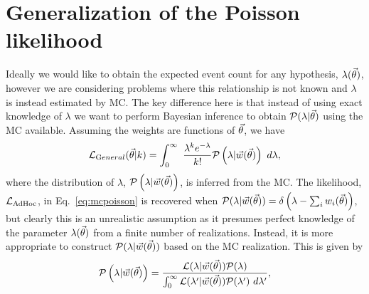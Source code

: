 \section{Generalization of the Poisson likelihood\label{sec:generalization_poisson}}


Ideally we would like to obtain the expected event count for any hypothesis, $\lambda(\vec{\theta})$, however we are considering problems where this relationship is not known and $\lambda$ is instead estimated by MC. The key difference here is that instead of using exact knowledge of $\lambda$ we want to perform Bayesian inference to obtain $\mathcal{P}(\lambda|\vec{\theta})$ using the MC available. Assuming the weights are functions of $\vec{\theta}$, we have 
\begin{equation} \label{eq:generalpoisson}
\mathcal{L}_{\textrm General}(\vec{\theta}|k) = \int_{0}^{\infty}~\frac{\lambda^{k}e^{-\lambda}}{k!}\mathcal{P}\left(\lambda|\vec{w}(\vec{\theta})\right)~d\lambda,
\end{equation}
where the distribution of $\lambda$, $\mathcal{P}\left(\lambda|\vec{w}(\vec{\theta})\right)$, is inferred from the MC. %
The likelihood, $\mathcal{L}_{\textmd{AdHoc}}$, in Eq.~\eqref{eq:mcpoisson} is recovered when $\mathcal{P}(\lambda|\vec{w}(\vec{\theta})) = \delta\left(\lambda - \sum_{i}{w_i(\vec{\theta})}\right)$, but clearly this is an unrealistic assumption as it presumes perfect knowledge of the parameter $\lambda(\vec{\theta})$ from a finite number of realizations. Instead, it is more appropriate to construct $\mathcal{P}(\lambda|\vec{w}(\vec{\theta}))$ based on the MC realization. This is given by
\begin{equation} \label{eq:posterior}
\mathcal{P}\left(\lambda|\vec{w}(\vec{\theta})\right) = \frac{\mathcal{L}(\lambda|\vec{w}(\vec{\theta}))\mathcal{P}(\lambda)}{\int_0^\infty \mathcal{L}(\lambda'|\vec{w}(\vec{\theta}))\mathcal{P}(\lambda')~d\lambda'},
\end{equation}
